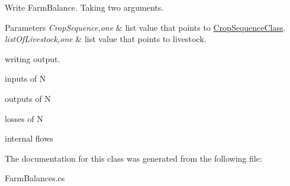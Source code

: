 Write Farm\+Balance. Taking two arguments. 


\begin{DoxyParams}{Parameters}
{\em Crop\+Sequence,one} & list value that points to \mbox{\hyperlink{class_crop_sequence_class}{Crop\+Sequence\+Class}}. \\
\hline
{\em list\+Of\+Livestock,one} & list value that points to livestock. \\
\hline
\end{DoxyParams}
writing output.

inputs of N

outputs of N

losses of N

internal flows 

The documentation for this class was generated from the following file\+:\begin{DoxyCompactItemize}
\item 
Farm\+Balances.\+cs\end{DoxyCompactItemize}
